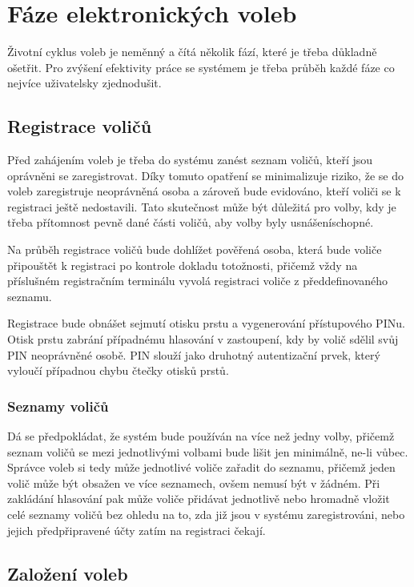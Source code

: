 \documentclass[11pt,twoside,a4paper]{book}
\begin{document}
\section{Fáze elektronických voleb}

Životní cyklus voleb je neměnný a čítá několik fází, které je třeba důkladně ošetřit. Pro zvýšení efektivity práce se systémem je třeba průběh každé fáze co nejvíce uživatelsky zjednodušit.

\subsection{Registrace voličů}

Před zahájením voleb je třeba do systému zanést seznam voličů, kteří jsou oprávněni se zaregistrovat. Díky tomuto opatření se minimalizuje riziko, že se do voleb zaregistruje neoprávněná osoba a zároveň bude evidováno, kteří voliči se k registraci ještě nedostavili. Tato skutečnost může být důležitá pro volby, kdy je třeba přítomnost pevně dané části voličů, aby volby byly usnášeníschopné.  

Na průběh registrace voličů bude dohlížet pověřená osoba, která bude voliče připouštět k registraci po kontrole dokladu totožnosti, přičemž vždy na příslušném registračním terminálu vyvolá registraci voliče z předdefinovaného seznamu.

Registrace bude obnášet sejmutí otisku prstu a vygenerování přístupového PINu. Otisk prstu zabrání případnému hlasování v zastoupení, kdy by volič sdělil svůj PIN neoprávněné osobě. PIN slouží jako druhotný autentizační prvek, který vyloučí případnou chybu čtečky otisků prstů. 

\subsubsection{Seznamy voličů} \label{sec:seznamy}

Dá se předpokládat, že systém bude používán na více než jedny volby, přičemž seznam voličů se mezi jednotlivými volbami bude lišit jen minimálně, ne-li vůbec. Správce voleb si tedy může jednotlivé voliče zařadit do seznamu, přičemž jeden volič může být obsažen ve více seznamech, ovšem nemusí být v žádném. Při zakládání hlasování pak může voliče přidávat jednotlivě nebo hromadně vložit celé seznamy voličů bez ohledu na to, zda již jsou v systému zaregistrováni, nebo jejich předpřipravené účty zatím na registraci čekají.

\subsection{Založení voleb}
\end{document}
